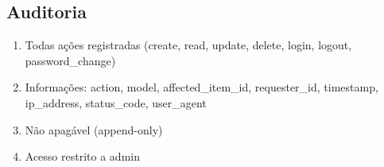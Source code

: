 \subsection{Auditoria}

\begin{enumerate}[topsep=1pt, itemsep=0pt]
  \item Todas ações registradas (create, read, update, delete, login, logout, password\_change)
  \item Informações: action, model, affected\_item\_id, requester\_id, timestamp, ip\_address, status\_code, user\_agent
  \item Não apagável (append-only)
  \item Acesso restrito a admin
\end{enumerate}
